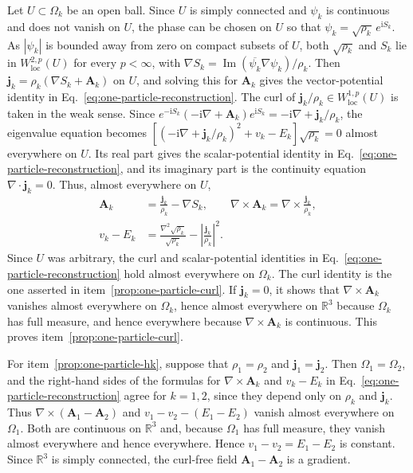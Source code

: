 \documentclass[11pt,a4paper]{article}
\theoremstyle{remark}
\theoremstyle{plain}
\newcommand{\R}{\mathbb R}
\newcommand{\jj}{\mathbf j}
\newcommand{\A}{\mathbf A}
\begin{document}
Let $U\subset\Omega_k$ be an open ball. Since $U$ is simply connected and
$\psi_k$ is continuous and does not vanish on $U$, the phase can be
chosen on $U$ so that $\psi_k=\sqrt{\rho_k}\,e^{\mathrm{i}S_k}$. As $|\psi_k|$ is bounded
away from zero on compact subsets of $U$, both $\sqrt{\rho_k}$ and $S_k$
lie in $W^{2,p}_{\mathrm{loc}}(U)$ for every $p<\infty$, with
$\nabla S_k=\operatorname{Im}(\overline{\psi_k}\nabla\psi_k)/\rho_k$. Then
$\jj_k=\rho_k(\nabla S_k+\A_k)$ on $U$, and solving this
for $\A_k$ gives the vector-potential identity in
Eq.~\eqref{eq:one-particle-reconstruction}. The curl of
$\jj_k/\rho_k\in W^{1,p}_{\mathrm{loc}}(U)$ is taken in the
weak sense. Since
$e^{-\mathrm{i}S_k}(-\mathrm{i}\nabla+\A_k)e^{\mathrm{i}S_k}=-\mathrm{i}\nabla+\jj_k/\rho_k$,
the eigenvalue equation becomes
$[(-\mathrm{i}\nabla+\jj_k/\rho_k)^2+v_k-E_k]\sqrt{\rho_k}=0$ almost
everywhere on $U$. Its real part gives the scalar-potential identity in
Eq.~\eqref{eq:one-particle-reconstruction}, and its imaginary part is the continuity equation
$\nabla\cdot\jj_k=0$. Thus, almost everywhere on $U$,
\begin{equation}
 \begin{aligned}
 \A_k&=\frac{\jj_k}{\rho_k}-\nabla S_k,\qquad
 \nabla\times\A_k=\nabla\times\frac{\jj_k}{\rho_k},\\
 v_k-E_k&=\frac{\nabla^2\sqrt{\rho_k}}{\sqrt{\rho_k}}
             -\left|\frac{\jj_k}{\rho_k}\right|^2.
 \end{aligned}
 \label{eq:one-particle-reconstruction}
\end{equation}
Since $U$ was arbitrary, the curl and scalar-potential identities in
Eq.~\eqref{eq:one-particle-reconstruction} hold almost everywhere on
$\Omega_k$. The curl identity is the one asserted in
item~\ref{prop:one-particle-curl}. If $\jj_k=0$, it shows that
$\nabla\times\A_k$ vanishes almost everywhere on $\Omega_k$, hence
almost everywhere on $\R^3$ because $\Omega_k$ has full measure, and
hence everywhere because $\nabla\times\A_k$ is continuous. This proves
item~\ref{prop:one-particle-curl}.

For item~\ref{prop:one-particle-hk}, suppose that
$\rho_1=\rho_2$ and $\jj_1=\jj_2$. Then $\Omega_1=\Omega_2$, and the
right-hand sides of the formulas for $\nabla\times\A_k$ and $v_k-E_k$ in
Eq.~\eqref{eq:one-particle-reconstruction} agree for $k=1,2$, since they
depend only on $\rho_k$ and $\jj_k$.
Thus $\nabla\times(\A_1-\A_2)$ and $v_1-v_2-(E_1-E_2)$ vanish almost
everywhere on $\Omega_1$. Both are continuous on $\R^3$ and, because
$\Omega_1$ has full measure, they vanish almost everywhere and hence
everywhere. Hence $v_1-v_2=E_1-E_2$ is constant. Since $\R^3$ is simply
connected, the curl-free field $\A_1-\A_2$ is a gradient.
\end{document}
